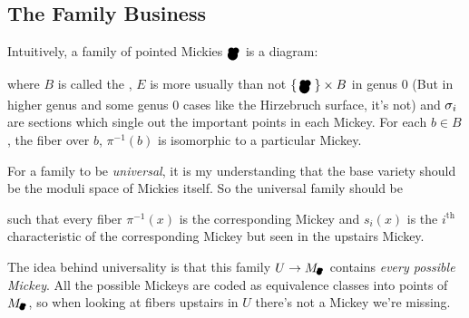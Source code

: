 \documentclass[12pt]{memoir}
\newcommand{\Mickey}{\pre{\raisebox{-1mm}{\scalebox{1.3}{\ensuremath\bullet}}}\hspace{-2.3 mm}{\raisebox{-1.65mm}{\scalebox{2.1}{\ensuremath\bullet}}}^{\hspace{-2.1mm}\raisebox{-1mm}{\scalebox{1.3}{\ensuremath\bullet}}}}
\newcommand{\Submickey}{\pre{\scalebox{0.75}{\ensuremath\bullet}}\hspace{-1.4mm}{\raisebox{-0.35mm}{\scalebox{1.1}{\ensuremath\bullet}}}^{\hspace{-1.1mm}\raisebox{-0.1mm}{\scalebox{0.75}{\ensuremath\bullet}}}}
\begin{document}
\subsection{The Family Business}

Intuitively, a family of pointed Mickies \(\Mickey\) is a diagram:
\begin{figure}[h!]
    \centering
    \label{fig-example-family-diagram}
\end{figure}
where \(B\) is called the , \(E\) is more usually than not \(\set{\Mickey}\x B\) in genus 0 (But in higher genus and some genus 0 cases like the Hirzebruch surface, it's not) and \(\sigma_i\) are sections which single out the important points in each Mickey. For each \(b\in B\), the fiber over \(b\), \(\pi^{-1}(b)\) is isomorphic to a particular Mickey.\par
For a family to be \emph{universal}, it is my understanding that the base variety should be the moduli space of Mickies itself. So the universal family should be

\begin{figure}[h!]
    \centering
    \label{fig-example-universal-family-diagram}
\end{figure}

such that every fiber \(\pi^{-1}(x)\) is the corresponding Mickey and \(s_i(x)\) is the \(i^{\text{th}}\) characteristic of the corresponding Mickey but seen in the upstairs Mickey.

\begin{Rmk}\label{rmk-intuition-universal-family}
    The idea behind universality is that this family \(U\to M_{\Submickey}\) contains \emph{every possible Mickey}. All the possible Mickeys are coded as equivalence classes into points of \(M_{\Submickey}\), so when looking at fibers upstairs in \(U\) there's not a Mickey we're missing.
\end{Rmk}
\end{document}
